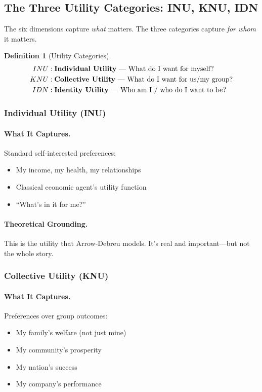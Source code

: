 \documentclass[12pt,a4paper]{article}
\newtheorem{definition}[theorem]{Definition}
\begin{document}
\subsection{The Three Utility Categories: INU, KNU, IDN}

The six dimensions capture \emph{what} matters.
The three categories capture \emph{for whom} it matters.

\begin{definition}[Utility Categories]
\begin{align*}
  INU &: \text{\textbf{Individual Utility} --- What do I want for myself?} \\
  KNU &: \text{\textbf{Collective Utility} --- What do I want for us/my group?} \\
  IDN &: \text{\textbf{Identity Utility} --- Who am I / who do I want to be?}
\end{align*}
\end{definition}

\subsubsection{Individual Utility (INU)}

\paragraph{What It Captures.}
Standard self-interested preferences:
\begin{itemize}
  \item My income, my health, my relationships
  \item Classical economic agent's utility function
  \item ``What's in it for me?''
\end{itemize}

\paragraph{Theoretical Grounding.}
This is the utility that Arrow-Debreu models.
It's real and important---but not the whole story.

\subsubsection{Collective Utility (KNU)}

\paragraph{What It Captures.}
Preferences over group outcomes:
\begin{itemize}
  \item My family's welfare (not just mine)
  \item My community's prosperity
  \item My nation's success
  \item My company's performance
\end{itemize}
\end{document}
